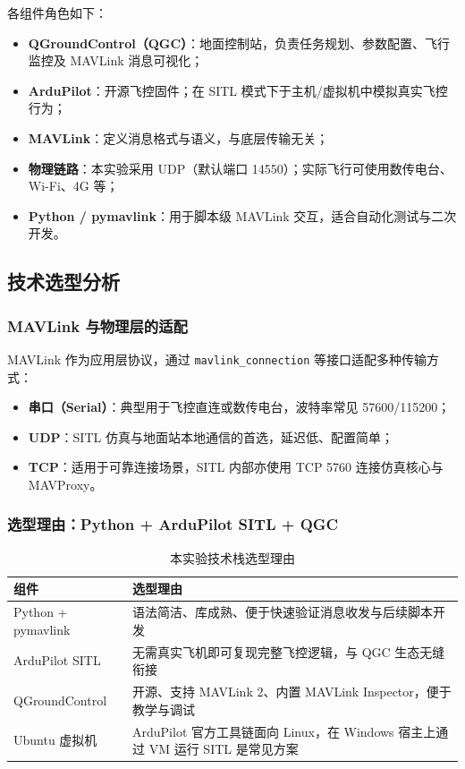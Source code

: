\documentclass[12pt,a4paper]{article}
\begin{document}
各组件角色如下：
\begin{itemize}[leftmargin=2em]
    \item \textbf{QGroundControl（QGC）}：地面控制站，负责任务规划、参数配置、飞行监控及 MAVLink 消息可视化；
    \item \textbf{ArduPilot}：开源飞控固件；在 SITL 模式下于主机/虚拟机中模拟真实飞控行为；
    \item \textbf{MAVLink}：定义消息格式与语义，与底层传输无关；
    \item \textbf{物理链路}：本实验采用 UDP（默认端口 14550）；实际飞行可使用数传电台、Wi-Fi、4G 等；
    \item \textbf{Python / pymavlink}：用于脚本级 MAVLink 交互，适合自动化测试与二次开发。
\end{itemize}

\subsection{技术选型分析}

\subsubsection{MAVLink 与物理层的适配}

MAVLink 作为应用层协议，通过 \texttt{mavlink\_connection} 等接口适配多种传输方式：
\begin{itemize}[leftmargin=2em]
    \item \textbf{串口（Serial）}：典型用于飞控直连或数传电台，波特率常见 57600/115200；
    \item \textbf{UDP}：SITL 仿真与地面站本地通信的首选，延迟低、配置简单；
    \item \textbf{TCP}：适用于可靠连接场景，SITL 内部亦使用 TCP 5760 连接仿真核心与 MAVProxy。
\end{itemize}

\subsubsection{选型理由：Python + ArduPilot SITL + QGC}

\begin{table}[htbp]
\centering
\caption{本实验技术栈选型理由}
\begin{tabular}{p{3.5cm}p{9.5cm}}
\toprule
\textbf{组件} & \textbf{选型理由} \\
\midrule
Python + pymavlink & 语法简洁、库成熟、便于快速验证消息收发与后续脚本开发 \\
ArduPilot SITL & 无需真实飞机即可复现完整飞控逻辑，与 QGC 生态无缝衔接 \\
QGroundControl & 开源、支持 MAVLink 2、内置 MAVLink Inspector，便于教学与调试 \\
Ubuntu 虚拟机 & ArduPilot 官方工具链面向 Linux，在 Windows 宿主上通过 VM 运行 SITL 是常见方案 \\
\bottomrule
\end{tabular}
\end{table}
\end{document}
